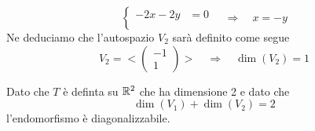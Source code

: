 \begin{example}
\begin{itemize}
\[			      \begin{cases}
				      -2x - 2y & = 0 \\
			      \end{cases} \quad \Rightarrow \quad
			      x = -y
		      \]
		      Ne deduciamo che l'autospazio $V_2$ sarà definito come segue
		      \[
			      V_2 = < \begin{pmatrix} -1 \\ 1 \end{pmatrix} > \quad \Rightarrow \quad
			      \dim(V_2) = 1
		      \]
	\end{itemize}
	Dato che $T$ è definta su $\mathbb{R}^2$ che ha dimensione 2 e dato che
	\[ \dim(V_1) + \dim(V_2) = 2 \] l'endomorfismo è diagonalizzabile.
\end{example}
